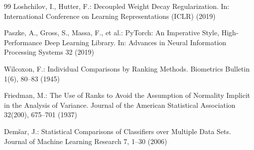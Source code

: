 \begin{thebibliography}{99}
Loshchilov, I., Hutter, F.: Decoupled Weight Decay Regularization. In:
International Conference on Learning Representations (ICLR) (2019)

Paszke, A., Gross, S., Massa, F., et al.: PyTorch: An Imperative Style,
High-Performance Deep Learning Library. In: Advances in Neural Information
Processing Systems 32 (2019)

Wilcoxon, F.: Individual Comparisons by Ranking Methods. Biometrics Bulletin
1(6), 80--83 (1945)

Friedman, M.: The Use of Ranks to Avoid the Assumption of Normality Implicit in
the Analysis of Variance. Journal of the American Statistical Association
32(200), 675--701 (1937)

Dem\v{s}ar, J.: Statistical Comparisons of Classifiers over Multiple Data Sets.
Journal of Machine Learning Research 7, 1--30 (2006)

\end{thebibliography}
